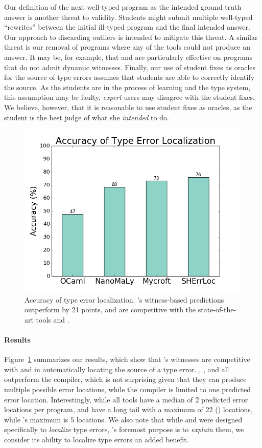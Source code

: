 Our definition of the next well-typed program as the intended ground
truth answer is another threat to validity. Students might submit
multiple well-typed ``rewrites'' between the initial ill-typed program
and the final intended answer.
%
Our approach to discarding outliers is intended to mitigate this threat.
%
A similar threat is our removal of programs where any of the tools could
not produce an answer.
%
It may be, for example, that \mycroft and \sherrloc are particularly
effective on programs that do not admit dynamic witnesses.
%
Finally, our use of student fixes as oracles for the source of type
errors assumes that students are able to correctly identify the source.
%
As the students are in the process of learning \ocaml and the type
system, this assumption may be faulty, \emph{expert} users may disagree
with the student fixes.
%
We believe, however, that it is reasonable to use student fixes as
oracles, as the student is the best judge of what she \emph{intended} to
do.

\begin{figure}[t]
\includegraphics[width=0.7\linewidth]{blame.png}
\caption{Accuracy of type error localization. \toolname's witness-based
  predictions outperform \ocaml by 21 points, and are competitive
  with the state-of-the-art tools \mycroft and \sherrloc.}
\label{fig:results-blame}
\end{figure}

\paragraph{Results}
Figure~\ref{fig:results-blame} summarizes our results, which show that
\toolname's witnesses are competitive with \mycroft and \sherrloc in
automatically locating the source of a type error.
%
\toolname, \mycroft, and \sherrloc all outperform the \ocaml compiler,
which is not surprising given that they can produce multiple possible
error locations, while the \ocaml compiler is limited to one predicted
error location.
%
Interestingly, while all tools have a median of 2 predicted error
locations per program, \mycroft and \sherrloc have a long tail with a
maximum of 22 () locations, while \toolname's maximum is 5
locations.
%
We also note that while \mycroft and \sherrloc were designed
specifically to \emph{localize} type errors, \toolname's foremost
purpose is to \emph{explain} them, we consider its ability to localize
type errors an added benefit.

